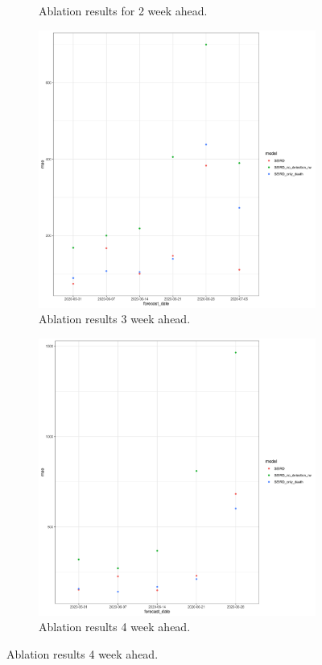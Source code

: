 \documentclass[11pt]{amsart}
\begin{document}
\begin{figure}
\begin{subfigure}{.5\textwidth}
    \caption{Ablation results for 2 week ahead.}
\end{subfigure}
\begin{subfigure}{.5\textwidth}
  \centering
    \includegraphics[scale=.05]{ablation_3.png}
    \caption{Ablation results 3 week ahead.}
\end{subfigure}%
\begin{subfigure}{.5\textwidth}
  \centering
    \includegraphics[scale=.05]{ablation_4.png}
    \caption{Ablation results 4 week ahead. }
\end{subfigure}


\end{figure}
\end{document}
